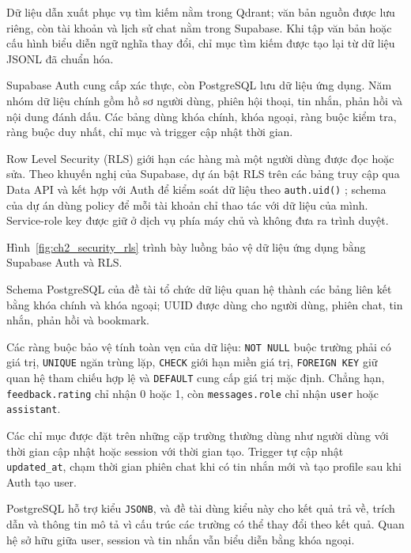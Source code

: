 \documentclass[12pt,a4paper,oneside]{report}
\begin{document}
Dữ liệu dẫn xuất phục vụ tìm kiếm nằm trong Qdrant; văn bản nguồn được lưu riêng, còn tài khoản và lịch sử chat nằm trong Supabase. Khi tập văn bản hoặc cấu hình biểu diễn ngữ nghĩa thay đổi, chỉ mục tìm kiếm được tạo lại từ dữ liệu JSONL đã chuẩn hóa.

Supabase Auth cung cấp xác thực, còn PostgreSQL lưu dữ liệu ứng dụng. Năm nhóm dữ liệu chính gồm hồ sơ người dùng, phiên hội thoại, tin nhắn, phản hồi và nội dung đánh dấu. Các bảng dùng khóa chính, khóa ngoại, ràng buộc kiểm tra, ràng buộc duy nhất, chỉ mục và trigger cập nhật thời gian.

Row Level Security (RLS) giới hạn các hàng mà một người dùng được đọc hoặc sửa. Theo khuyến nghị của Supabase, dự án bật RLS trên các bảng truy cập qua Data API và kết hợp với Auth để kiểm soát dữ liệu theo \texttt{auth.uid()} \cite{supabase_rls_docs}; schema của dự án dùng policy để mỗi tài khoản chỉ thao tác với dữ liệu của mình. Service-role key được giữ ở dịch vụ phía máy chủ và không đưa ra trình duyệt.

Hình~\ref{fig:ch2_security_rls} trình bày luồng bảo vệ dữ liệu ứng dụng bằng Supabase Auth và RLS.

Schema PostgreSQL của đề tài tổ chức dữ liệu quan hệ thành các bảng liên kết bằng khóa chính và khóa ngoại; UUID được dùng cho người dùng, phiên chat, tin nhắn, phản hồi và bookmark.

Các ràng buộc bảo vệ tính toàn vẹn của dữ liệu: \texttt{NOT NULL} buộc trường phải có giá trị, \texttt{UNIQUE} ngăn trùng lặp, \texttt{CHECK} giới hạn miền giá trị, \texttt{FOREIGN KEY} giữ quan hệ tham chiếu hợp lệ và \texttt{DEFAULT} cung cấp giá trị mặc định. Chẳng hạn, \texttt{feedback.rating} chỉ nhận 0 hoặc 1, còn \texttt{messages.role} chỉ nhận \texttt{user} hoặc \texttt{assistant}.

Các chỉ mục được đặt trên những cặp trường thường dùng như người dùng với thời gian cập nhật hoặc session với thời gian tạo. Trigger tự cập nhật \texttt{updated\_at}, chạm thời gian phiên chat khi có tin nhắn mới và tạo profile sau khi Auth tạo user.

PostgreSQL hỗ trợ kiểu \texttt{JSONB}, và đề tài dùng kiểu này cho kết quả trả về, trích dẫn và thông tin mô tả vì cấu trúc các trường có thể thay đổi theo kết quả. Quan hệ sở hữu giữa user, session và tin nhắn vẫn biểu diễn bằng khóa ngoại.


\end{document}
